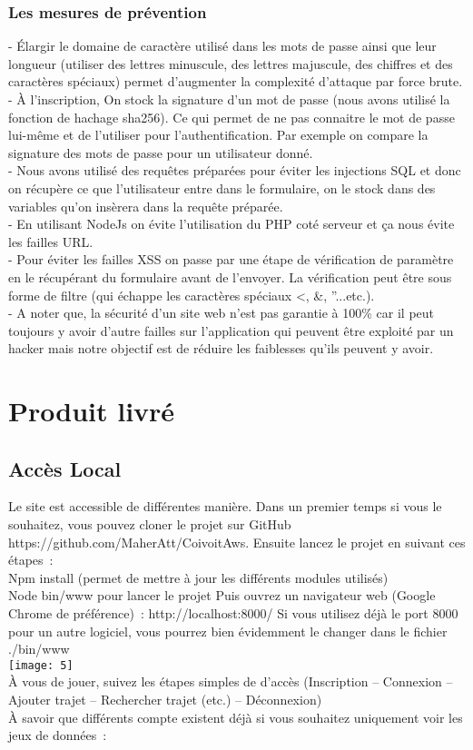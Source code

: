 \documentclass{article}
\begin{document}
\subsubsection{Les mesures de prévention}
- Élargir le domaine de caractère utilisé dans les mots de passe ainsi que leur longueur (utiliser des lettres minuscule, des lettres majuscule, des chiffres et des caractères spéciaux) permet d’augmenter la complexité d’attaque par force brute. \\
- À l’inscription, On stock la signature d’un mot de passe (nous avons utilisé la fonction de hachage sha256). Ce qui permet de ne pas connaitre le mot de passe lui-même et de l’utiliser pour l’authentification. Par exemple on compare la signature des mots de passe pour un utilisateur donné. \\
- Nous avons utilisé des requêtes préparées pour éviter les injections SQL et donc on récupère ce que l’utilisateur entre dans le formulaire, on le stock dans des variables qu’on insèrera dans la requête préparée. \\
- En utilisant NodeJs on évite l’utilisation du PHP coté serveur et ça nous évite les failles URL. \\
- Pour éviter les failles XSS on passe par une étape de vérification de paramètre en le récupérant du formulaire avant de l’envoyer. La vérification peut être sous forme de filtre (qui échappe les caractères spéciaux <, &, ”...etc.). \\
- A noter que, la sécurité d’un site web n’est pas garantie à 100\% car il peut toujours y avoir d’autre failles sur l’application qui peuvent être exploité par un hacker mais notre objectif est de réduire les faiblesses qu’ils peuvent y avoir.

\section{Produit livré}
\subsection{Accès Local
}
Le site est accessible de différentes manière. Dans un premier temps si vous le souhaitez, vous pouvez cloner le projet sur GitHub https://github.com/MaherAtt/CoivoitAws.
Ensuite lancez le projet en suivant ces étapes : \\
Npm install (permet de mettre à jour les différents modules utilisés) \\
Node bin/www pour lancer le projet
Puis ouvrez un navigateur web (Google Chrome de préférence) :  http://localhost:8000/
Si vous utilisez déjà le port 8000 pour un autre logiciel, vous pourrez bien évidemment le changer dans le fichier ./bin/www \\
\texttt{[image: 5]} \\
À vous de jouer, suivez les étapes simples de d’accès (Inscription – Connexion – Ajouter trajet – Rechercher trajet (etc.) – Déconnexion) \\
À savoir que différents compte existent déjà si vous souhaitez uniquement voir les jeux de données : \\
\end{document}
